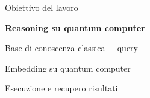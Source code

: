 \begin{frame}[plain]
	\transfade[duration=0.5]
	\maketitle
\end{frame}


\begin{frame}{Obiettivo del lavoro}
	\begin{center}
		\begin{minipage}{.7\linewidth}
			\hfill
			\begin{block}{}
				\centering
				\large
				\textbf{Reasoning su quantum computer}
			\end{block}
			\hfill
			\begin{block}{}
				\centering
				Base di conoscenza classica + query
			\end{block}
			\hfill
			\begin{block}{}
				\centering
				Embedding su quantum computer
			\end{block}
			\hfill
			\begin{block}{}
				\centering
				Esecuzione e recupero risultati
			\end{block}
			\hfill
		\end{minipage}
	\end{center}
\end{frame}

